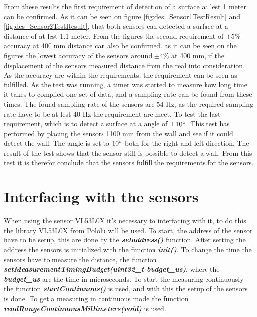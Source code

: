 From these results the first requirement of detection of a surface at lest 1 meter can be confirmed. As it can be seen on figure \ref{fig:des_Sensor1TestResult} and \ref{fig:des_Sensor2TestResult}, that both sensors can detected a surface at a distance of at lest 1.1 meter.
\newline
From the figures the second requirement of $\pm5 \%$ accuracy at 400 mm distance can also be confirmed. as it can be seen on the figures the lowest accuracy of the sensors around $\pm 4 \%$ at 400 mm, if the displacement of the sensors measured distance from the real into consideration. As the accuracy are within the requirements, the requirement can be seen as fulfilled.
\newline
As the test was running, a timer was started to measure how long time it takes to complied one set of data, and a sampling rate can be found from these times. The found sampling rate of the sensors are 54 Hz, as the required sampling rate have to be at lest 40 Hz the requirement are meet.
\newline
To test the last requirement, which is to detect a surface at a angle of  $\pm 10 \degree$. This test has performed by placing the sensors 1100 mm from the wall and see if it could detect the wall. The angle is set to $10 \degree$ both for the right and left direction. The result of the test shows that the sensor still is possible to detect a wall. From this test it is therefor conclude that the sensors fulfill the requirements for the sensors.

%
%
%
\section{Interfacing with the sensors}\label{sec:interfacingVL53L0X}%
When using the sensor VL53L0X it's necessary to interfacing with it, to do this the library VL53L0X from Pololu will be used. 
\newline
To start, the address of the sensor have to be setup, this are done by the \textbf{\textit{setaddress()}} function. After setting the address the sensors is initialized with the function \textbf{\textit{init()}}. To change the time the sensors have to measure the distance, the function \textbf{\textit{setMeasurementTimingBudget(uint32{\_}t budget{\_}us)}}, where the  \textbf{\textit{budget{\_}us}} are the time in microseconds.
To start the measuring continuously the function \textbf{\textit{startContinuous()}} is used, and with this the setup of the sensors is done.
To get a measuring in continuous mode the function \textbf{\textit{readRangeContinuousMillimeters(void)}} is used.

